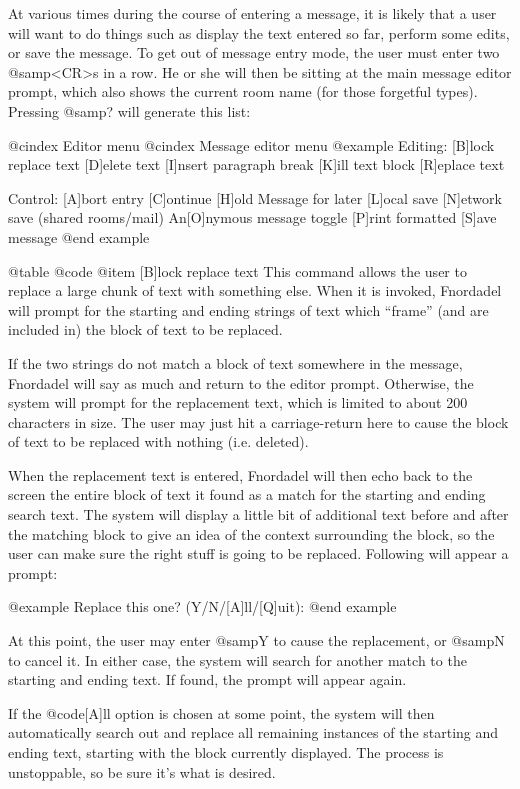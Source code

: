 At various times during the course of entering a message,
it is likely that a user will want to do things such as display
the text entered so far, perform some edits, or save the message.
To get out of message entry mode, the user must enter two @samp{<CR>s}
in a row.  He or she will then be sitting
at the main message editor prompt, which also shows the current room
name (for those forgetful types).  Pressing @samp{?} will generate this list:

@cindex Editor menu
@cindex Message editor menu
@example
Editing:
[B]lock replace text
[D]elete text
[I]nsert paragraph break
[K]ill text block
[R]eplace text

Control:
[A]bort entry
[C]ontinue
[H]old Message for later
[L]ocal save
[N]etwork save (shared rooms/mail)
An[O]nymous message toggle
[P]rint formatted
[S]ave message
@end example

@table @code
@item [B]lock replace text
This command allows the user to replace a large
chunk of text with something else.  When it is invoked,
Fnordadel will prompt for the starting and ending strings
of text which ``frame'' (and are included in) the block of
text to be replaced.

If the two strings do not match a block of text
somewhere in the message, Fnordadel will say as much and
return to the editor prompt.  Otherwise, the system will
prompt for the replacement text, which is limited to about
200 characters in size.  The user may just hit a carriage-return
here to cause the block of text to be replaced with
nothing (i.e. deleted).

When the replacement text is entered, Fnordadel
will then echo back to the screen the entire block of text
it found as a match for the starting and ending search text.
The system will display a little bit of additional text
before and after the matching block to give an idea of the
context surrounding the block, so the user can make sure
the right stuff is going to be replaced.  Following will
appear a prompt:

@example
Replace this one? (Y/N/[A]ll/[Q]uit):
@end example

At this point, the user may enter @samp{Y} to cause the replacement,
or @samp{N} to cancel it.  In either case, the
system will search for another match to the starting
and ending text.  If found, the prompt will appear again.

If the @code{[A]ll} option is chosen at some point, the
system will then automatically search out and replace all
remaining instances of the starting and ending text,
starting with the block currently displayed.  The process is
unstoppable, so be sure it's what is desired.

